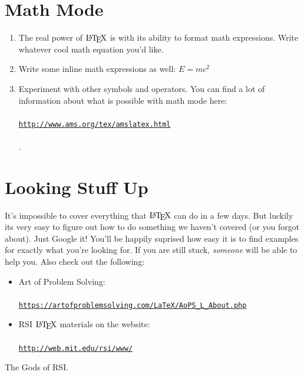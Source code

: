 \documentclass[12pt, a4paper]{article}
\begin{document}
    \section{Math Mode}
    \begin{enumerate}
        \item  The real power of $\textrm{\LaTeX }$ is with its ability to format math expressions. Write whatever cool math equation you’d like.
        \item Write some inline math expressions as well: $E=mc^2$
        \item Experiment with other symbols and operators. You can find a lot of information about what is possible with math mode here:\\ \\
    \href{http://www.ams.org/publications/authors/tex/amslatex}{\texttt{http://www.ams.org/tex/amslatex.html}}\\ \\ 
    .
    \end{enumerate}
    \section{Looking Stuff Up}
    It’s impossible to cover everything that $\textrm{\LaTeX }$ can do in a few days. But luckily its very easy to figure out how to do something we haven’t covered (or you forgot about). Just Google it! You’ll be happily suprised how easy it is to ﬁnd examples for exactly what you’re looking for. If you are still stuck, \textit{someone} will be able to help you. Also check out the following: 
    \begin{itemize}
        \item Art of Problem Solving:\\ \\
        \href{https://artofproblemsolving.com/LaTeX/AoPS_L_About.php}{\texttt{https://artofproblemsolving.com/LaTeX/AoPS\_L\_About.php}}\\ 
        \item  RSI $\textrm{\LaTeX }$ materials on the website:\\ \\
        \href{http://web.mit.edu/rsi/www/}{\texttt{http://web.mit.edu/rsi/www/}}
    \end{itemize}
        
    \begin{thebibliography}{9}
     The Gods of RSI.
    
    \end{thebibliography}
\end{document}
